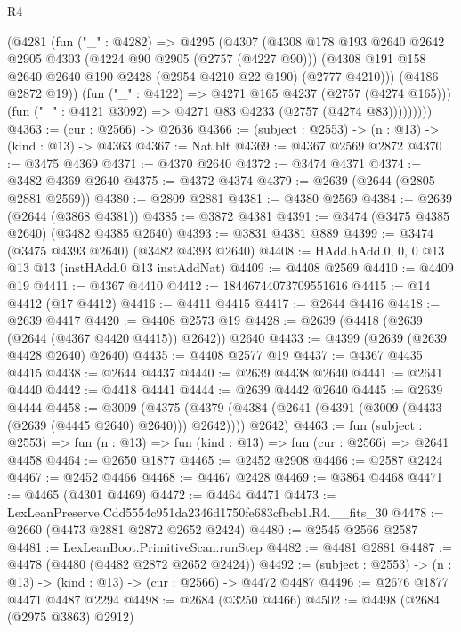 \begin{lexlean}{R4}
\begin{coremodule}
            (@4281
              (fun ("_" : @4282) =>
              @4295
                (@4307
                  (@4308
                    @178
                    @193
                    @2640
                    @2642
                    @2905
                    @4303
                    (@4224 @90 @2905 (@2757 (@4227 @90)))
                    (@4308 @191 @158 @2640 @2640 @190 @2428 (@2954 @4210 @22 @190) (@2777 @4210)))
                  (@4186 @2872 @19))
                (fun ("_" : @4122) => @4271 @165 @4237 (@2757 (@4274 @165)))
                (fun ("_" : @4121 @3092) => @4271 @83 @4233 (@2757 (@4274 @83)))))))))
@4363 := (cur : @2566) -> @2636
@4366 := (subject : @2553) -> (n : @13) -> (kind : @13) -> @4363
@4367 := Nat.blt
@4369 := @4367 @2569 @2872
@4370 := @3475 @4369
@4371 := @4370 @2640
@4372 := @3474 @4371
@4374 := @3482 @4369 @2640
@4375 := @4372 @4374
@4379 := @2639 (@2644 (@2805 @2881 @2569))
@4380 := @2809 @2881
@4381 := @4380 @2569
@4384 := @2639 (@2644 (@3868 @4381))
@4385 := @3872 @4381
@4391 := @3474 (@3475 @4385 @2640) (@3482 @4385 @2640)
@4393 := @3831 @4381 @889
@4399 := @3474 (@3475 @4393 @2640) (@3482 @4393 @2640)
@4408 := HAdd.hAdd.{0, 0, 0} @13 @13 @13 (instHAdd.{0} @13 instAddNat)
@4409 := @4408 @2569
@4410 := @4409 @19
@4411 := @4367 @4410
@4412 := 18446744073709551616
@4415 := @14 @4412 (@17 @4412)
@4416 := @4411 @4415
@4417 := @2644 @4416
@4418 := @2639 @4417
@4420 := @4408 @2573 @19
@4428 := @2639 (@4418 (@2639 (@2644 (@4367 @4420 @4415)) @2642)) @2640
@4433 := @4399 (@2639 (@2639 @4428 @2640) @2640)
@4435 := @4408 @2577 @19
@4437 := @4367 @4435 @4415
@4438 := @2644 @4437
@4440 := @2639 @4438 @2640
@4441 := @2641 @4440
@4442 := @4418 @4441
@4444 := @2639 @4442 @2640
@4445 := @2639 @4444
@4458 := @3009
    (@4375 (@4379 (@4384 (@2641 (@4391 (@3009 (@4433 (@2639 (@4445 @2640) @2640))) @2642)))) @2642)
@4463 := fun (subject : @2553) =>
  fun (n : @13) => fun (kind : @13) => fun (cur : @2566) => @2641 @4458
@4464 := @2650 @1877
@4465 := @2452 @2908
@4466 := @2587 @2424
@4467 := @2452 @4466
@4468 := @4467 @2428
@4469 := @3864 @4468
@4471 := @4465 (@4301 @4469)
@4472 := @4464 @4471
@4473 := LexLeanPreserve.Cdd5554c951da2346d1750fe683cfbcb1.R4.__fits_30
@4478 := @2660 (@4473 @2881 @2872 @2652 @2424)
@4480 := @2545 @2566 @2587
@4481 := LexLeanBoot.PrimitiveScan.runStep
@4482 := @4481 @2881
@4487 := @4478 (@4480 (@4482 @2872 @2652 @2424))
@4492 := (subject : @2553) -> (n : @13) -> (kind : @13) -> (cur : @2566) -> @4472 @4487
@4496 := @2676 @1877 @4471 @4487 @2294
@4498 := @2684 (@3250 @4466)
@4502 := @4498 (@2684 (@2975 @3863) @2912)

\end{coremodule}
\end{lexlean}
